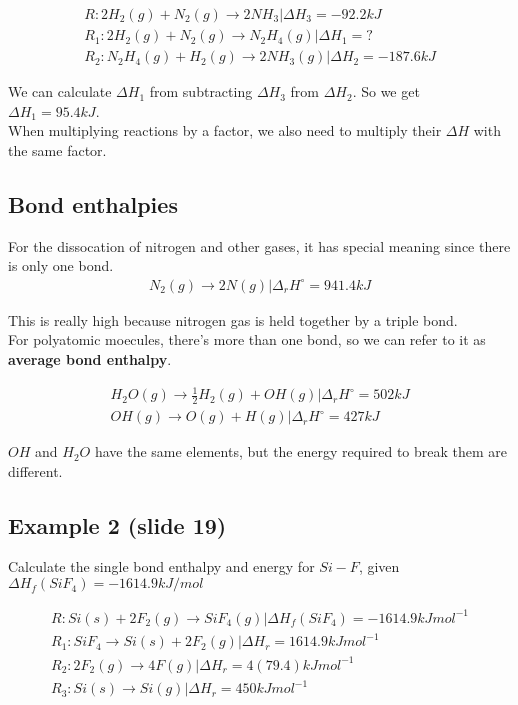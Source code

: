 \documentclass[12pt]{book}
\begin{document}
\begin{align*}
    R: 2H_2(g)+N_2(g)\rightarrow 2NH_3|\Delta H_3=-92.2kJ\\
    R_1: 2H_2(g)+N_2(g)\rightarrow N_2H_4(g)|\Delta H_1=?\\
    R_2:N_2H_4(g)+H_2(g)\rightarrow 2NH_3(g)|\Delta H_2=-187.6kJ
\end{align*}

We can calculate $\Delta H_1$ from subtracting $\Delta H_3$ from $\Delta H_2$. So we get $\Delta H_1=95.4kJ$.\\

When multiplying reactions by a factor, we also need to multiply their $\Delta H$ with the same factor.

\subsection*{Bond enthalpies}
For the dissocation of nitrogen and other gases, it has special meaning since there is only one bond.
\begin{align*}
    N_2(g)\rightarrow 2N(g)|\Delta_r H^{\circ}=941.4kJ
\end{align*}

This is really high because nitrogen gas is held together by a triple bond.\\

For polyatomic moecules, there's more than one bond, so we can refer to it as \textbf{average bond enthalpy}.

\begin{align*}
    H_2O(g)\rightarrow \frac{1}{2}H_2(g)+OH(g)|\Delta _r H^{\circ}=502kJ\\
    OH(g)\rightarrow O(g)+H(g)|\Delta_r H^{\circ}=427kJ
\end{align*}

$OH$ and $H_2O$ have the same elements, but the energy required to break them are different.

\subsection*{Example 2 (slide 19)}

Calculate the single bond enthalpy and energy for $Si-F$, given $\Delta H_f(SiF_4)=-1614.9 kJ/mol$

\begin{align*}
    R: Si(s)+2F_2(g)\rightarrow SiF_4(g)|\Delta H_f(SiF_4)=-1614.9 kJmol^{-1}\\
    R_1: SiF_4\rightarrow Si(s)+2F_2(g)|\Delta H_r=1614.9kJmol^{-1}\\
    R_2: 2F_2(g)\rightarrow 4F(g)|\Delta H_r=4(79.4)kJmol^{-1}\\
    R_3: Si(s)\rightarrow Si(g)|\Delta H_r=450kJmol^{-1}
\end{align*}
\end{document}

